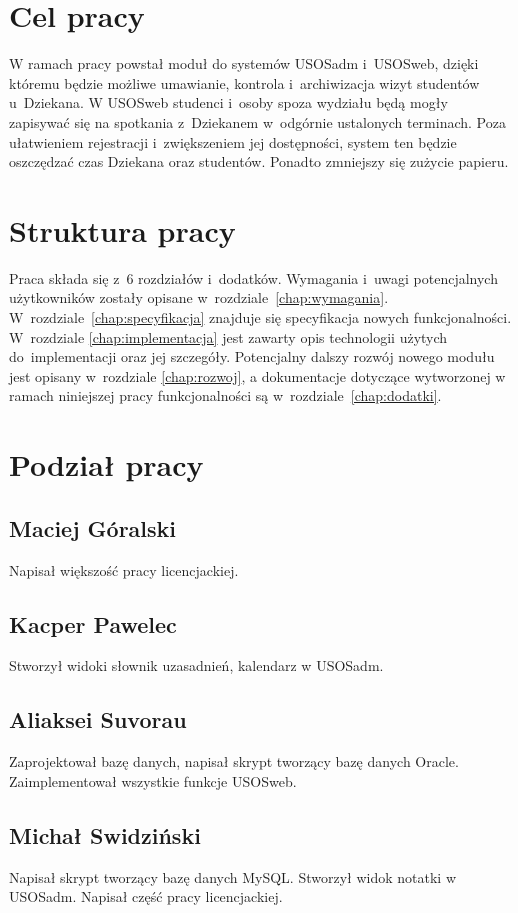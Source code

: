 \documentclass[licencjacka]{pracamgr}
\begin{document}
\section{Cel pracy}
W ramach pracy powstał moduł do systemów USOSadm i~USOSweb, dzięki któremu będzie możliwe umawianie, kontrola i~archiwizacja wizyt studentów u~Dziekana. W USOSweb studenci i~osoby spoza wydziału będą mogły zapisywać się na spotkania z~Dziekanem w~odgórnie ustalonych terminach. Poza ułatwieniem rejestracji i~zwiększeniem jej dostępności, system ten będzie oszczędzać czas Dziekana oraz studentów. Ponadto zmniejszy się zużycie papieru.
\section{Struktura pracy}
Praca składa się z~6 rozdziałów i~dodatków.
Wymagania i~uwagi potencjalnych użytkowników zostały opisane w~rozdziale~\ref{chap:wymagania}.
W~rozdziale~\ref{chap:specyfikacja} znajduje się specyfikacja nowych funkcjonalności. W~rozdziale \ref{chap:implementacja} jest zawarty opis technologii użytych do~implementacji oraz jej szczegóły. Potencjalny dalszy rozwój nowego modułu jest opisany w~rozdziale \ref{chap:rozwoj}, a dokumentacje dotyczące wytworzonej w ramach niniejszej pracy funkcjonalności są w~rozdziale~\ref{chap:dodatki}. 

\section{Podział pracy}
\subsection{Maciej Góralski}
Napisał większość pracy licencjackiej.
\subsection{Kacper Pawelec}
Stworzył widoki słownik uzasadnień, kalendarz w USOSadm.
\subsection{Aliaksei Suvorau}
Zaprojektował bazę danych, napisał skrypt tworzący bazę danych Oracle. Zaimplementował wszystkie funkcje USOSweb.
\subsection{Michał Swidziński}
Napisał skrypt tworzący bazę danych MySQL. Stworzył widok notatki w USOSadm. Napisał część pracy licencjackiej.
\end{document}
